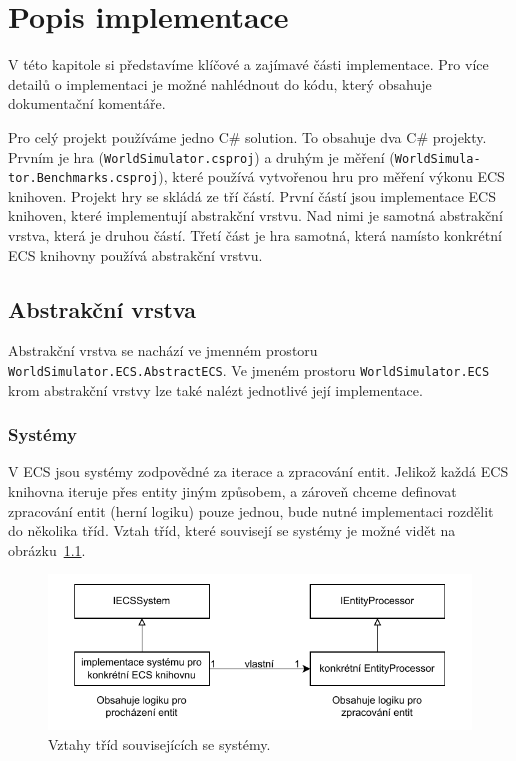 \chapter{Popis implementace}
V této kapitole si představíme klíčové a zajímavé části implementace. Pro více detailů o implementaci je možné nahlédnout do kódu, který obsahuje dokumentační komentáře.

Pro celý projekt používáme jedno C\# solution. To obsahuje dva C\# projekty. Prvním je hra (\texttt{WorldSimulator.csproj}) a druhým je měření (\texttt{WorldSimula-} \texttt{tor.Benchmarks.csproj}), které používá vytvořenou hru pro měření výkonu ECS knihoven. Projekt hry se skládá ze tří částí. První částí jsou implementace ECS knihoven, které implementují abstrakční vrstvu. Nad nimi je samotná abstrakční vrstva, která je druhou částí. Třetí část je hra samotná, která namísto konkrétní ECS knihovny používá abstrakční vrstvu.

\section{Abstrakční vrstva}
\label{sec:abstract-layer}
Abstrakční vrstva se nachází ve jmenném prostoru \texttt{WorldSimulator.ECS.AbstractECS}. Ve jmeném prostoru \texttt{WorldSimulator.ECS} krom abstrakční vrstvy lze také nalézt jednotlivé její implementace.

\subsection{Systémy}
V ECS jsou systémy zodpovědné za iterace a zpracování entit. Jelikož každá ECS knihovna iteruje přes entity jiným způsobem, a zároveň chceme definovat zpracování entit (herní logiku) pouze jednou, bude nutné implementaci rozdělit do několika tříd. Vztah tříd, které souvisejí se systémy je možné vidět na obrázku~\ref{fig:abstract-layer-systems}.

\begin{figure}[!htb]
  \centering
  \includegraphics[width=0.8\linewidth]{img/abstract-layer-systems.pdf}
  \caption{Vztahy tříd souvisejících se systémy.}
  \label{fig:abstract-layer-systems}
\end{figure}

